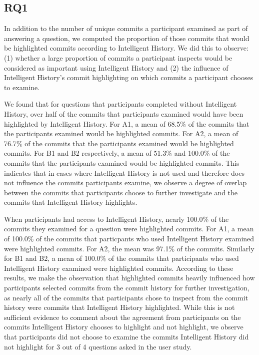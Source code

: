 
\subsection{RQ1}
\label{subsec:RQ1}


In addition to the number of unique commits a participant examined as part of answering a question,
we computed the proportion of those commits that would be highlighted commits according to Intelligent History.
We did this to observe:
(1) whether a large proportion of commits a participant inspects would be considered as important using Intelligent History
and (2) the influence of Intelligent History's commit highlighting on which commits a participant chooses to examine.

We found that for questions that participants completed without Intelligent History,
over half of the commits that participants examined would have been highlighted by Intelligent History.
For A1, a mean of 68.5\% of the commits that the participants examined would be highlighted commits.
For A2, a mean of 76.7\% of the commits that the participants examined would be highlighted commits.
For B1 and B2 respectively, a mean of 51.3\% and 100.0\% of the commits that the participants examined would be highlighted commits.
This indicates that in cases where Intelligent History is not used and therefore does not influence the commits participants examine,
we observe a degree of overlap between the commits that participants choose to further investigate and the commits that Intelligent History highlights.

When participants had access to Intelligent History,
nearly 100.0\% of the commits they examined for a question were highlighted commits.
For A1, a mean of 100.0\% of the commits that particpants who used Intelligent History examined were highlighted commits.
For A2, the mean was 97.1\% of the commits.
Similarly for B1 and B2, a mean of 100.0\% of the commits that participants who used Intelligent History examined were highlighted commits.
According to these results, we make the observation that highlighted commits heavily 
influenced how participants selected commits from the commit history for further investigation, as
nearly all of the commits that participants chose to inspect from the commit history were commits that Intelligent History highlighted.
While this is not sufficient evidence to comment about the agreement from participants on the commits Intelligent History
chooses to highlight and not highlight,
we observe that participants did not choose to examine the commits Intelligent History did not highlight
for 3 out of 4 questions asked in the user study.

